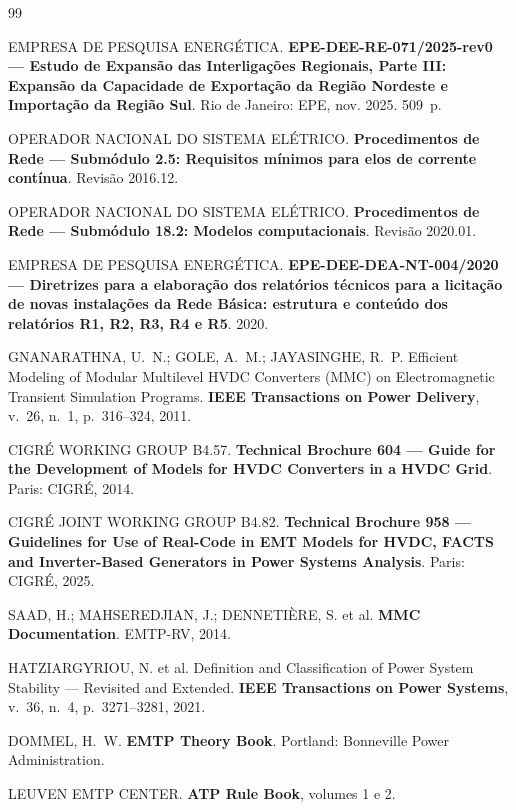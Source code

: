 \documentclass[12pt,a4paper]{article}
\begin{document}
\begin{thebibliography}{99}

EMPRESA DE PESQUISA ENERGÉTICA. \textbf{EPE-DEE-RE-071/2025-rev0 --- Estudo de Expansão das
Interligações Regionais, Parte III: Expansão da Capacidade de Exportação da Região Nordeste e
Importação da Região Sul}. Rio de Janeiro: EPE, nov. 2025. 509~p.

OPERADOR NACIONAL DO SISTEMA ELÉTRICO. \textbf{Procedimentos de Rede --- Submódulo 2.5: Requisitos
mínimos para elos de corrente contínua}. Revisão 2016.12.

OPERADOR NACIONAL DO SISTEMA ELÉTRICO. \textbf{Procedimentos de Rede --- Submódulo 18.2: Modelos
computacionais}. Revisão 2020.01.

EMPRESA DE PESQUISA ENERGÉTICA. \textbf{EPE-DEE-DEA-NT-004/2020 --- Diretrizes para a elaboração dos
relatórios técnicos para a licitação de novas instalações da Rede Básica: estrutura e conteúdo dos
relatórios R1, R2, R3, R4 e R5}. 2020.

GNANARATHNA, U.~N.; GOLE, A.~M.; JAYASINGHE, R.~P. Efficient Modeling of Modular Multilevel HVDC
Converters (MMC) on Electromagnetic Transient Simulation Programs. \textbf{IEEE Transactions on Power
Delivery}, v.~26, n.~1, p.~316--324, 2011.

CIGRÉ WORKING GROUP B4.57. \textbf{Technical Brochure 604 --- Guide for the Development of Models for
HVDC Converters in a HVDC Grid}. Paris: CIGRÉ, 2014.

CIGRÉ JOINT WORKING GROUP B4.82. \textbf{Technical Brochure 958 --- Guidelines for Use of Real-Code in
EMT Models for HVDC, FACTS and Inverter-Based Generators in Power Systems Analysis}. Paris: CIGRÉ,
2025.

SAAD, H.; MAHSEREDJIAN, J.; DENNETIÈRE, S. et al. \textbf{MMC Documentation}. EMTP-RV, 2014.

HATZIARGYRIOU, N. et al. Definition and Classification of Power System Stability --- Revisited and
Extended. \textbf{IEEE Transactions on Power Systems}, v.~36, n.~4, p.~3271--3281, 2021.

DOMMEL, H.~W. \textbf{EMTP Theory Book}. Portland: Bonneville Power Administration.

LEUVEN EMTP CENTER. \textbf{ATP Rule Book}, volumes 1 e 2.

\end{thebibliography}
\end{document}
